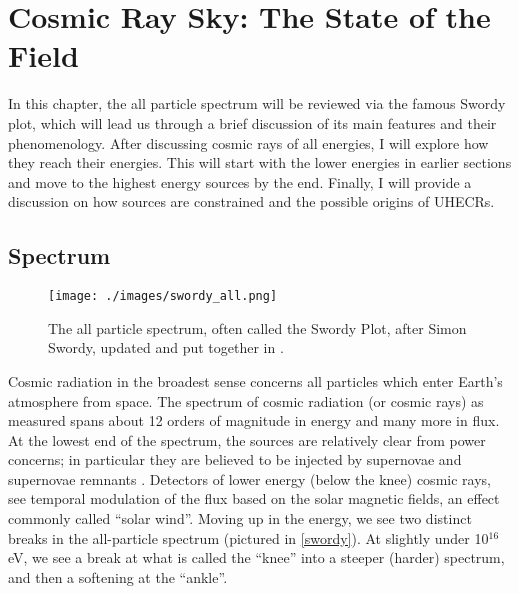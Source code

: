 
\chapter{Cosmic Ray Sky: The State of the Field}
In this chapter, the all particle spectrum will be reviewed via the famous Swordy plot, which will lead us through a brief discussion of its main features and their phenomenology. After discussing cosmic rays of all energies, I will explore how they reach their energies. This will start with the lower energies in earlier sections and move to the highest energy sources by the end. Finally, I will provide a discussion on how sources are constrained and the possible origins of UHECRs.
\section{Spectrum}

\begin{figure}
\begin{center}
\texttt{[image: ./images/swordy\_all.png]}
\begin{singlespace}
\caption[All Particle Spectrum (Swordy Plot)]{The all particle spectrum, often called the Swordy Plot, after Simon Swordy, updated and put together in\citeauthor{swordyplot} \textcite{swordyplot}.}
\end{singlespace}
\label{swordy}
\end{center}
\end{figure}


Cosmic radiation in the broadest sense concerns all particles which enter Earth's atmosphere from space. The spectrum of cosmic radiation (or cosmic rays)  as measured spans about 12 orders of magnitude in energy and many more in flux. At the lowest end of the spectrum, the sources are relatively clear from power concerns; in particular they are believed to be injected by supernovae and supernovae remnants \cite{stanev}. Detectors of lower energy (below the knee) cosmic rays, see temporal modulation of the flux based on the solar magnetic fields, an effect commonly called ``solar wind''. Moving up in the energy, we see two distinct breaks in the all-particle spectrum (pictured in \autoref{swordy}). At slightly under 10$^{16}$eV, we see a break at what is called the ``knee'' into a steeper (harder) spectrum, and then a softening at the ``ankle''. 

